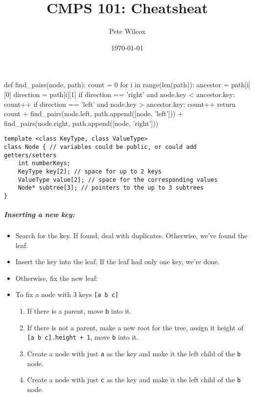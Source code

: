 \documentclass{article}
\title{CMPS 101: Cheatsheat}
\author{Pete Wilcox}
\date\today
\newcommand{\code}[1]{\texttt{#1}}
\begin{document}
\begin{python}
def find_pairs(node, path):
    count = 0
    for i in range(len(path)):
        ancestor = path[i][0]
        direction = path[i][1]
        if direction == 'right' and node.key < ancestor.key:
            count++
        if direction == 'left' and node.key > ancestor.key:
            count++
    return count + find_pairs(node.left, path.append([node, 'left'])) + 
        find_pairs(node.right, path.append([node, 'right']))
\end{python}

\begin{lstlisting}[frame=single,basicstyle=\footnotesize\ttfamily]
template <class KeyType, class ValueType>
class Node { // variables could be public, or could add getters/setters
    int numberKeys;
    KeyType key[2]; // space for up to 2 keys
    ValueType value[2]; // space for the corresponding values
    Node* subtree[3]; // pointers to the up to 3 subtrees
}
\end{lstlisting}

\subparagraph*{Inserting a new key:}
\begin{itemize}[noitemsep]
    \item Search for the key. If found, deal with duplicates. Otherwise, we've found the leaf.
    \item Insert the key into the leaf. If the leaf had only one key, we're done.
    \item Otherwise, fix the new leaf:
    \item To fix a node with 3 keys \code{[a b c]} 
    \begin{enumerate}[noitemsep]
        \item If there is a parent, move \code{b} into it.
        \item If there is not a parent, make a new root for the tree, assign it height of \code{[a b c].height + 1}, move \code{b} into it.
        \item Create a node with just \code{a} as the key and make it the left child of the \code{b} node.
        \item Create a node with just \code{c} as the key and make it the left child of the \code{b} node.
    \end{enumerate}
\end{itemize}
\end{document}
